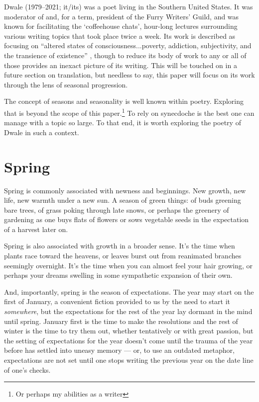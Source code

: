\documentclass[12pt,oneside]{memoir}
\begin{document}
Dwale (1979--2021; it/its) was a poet living in the Southern United States. It was moderator of and, for a term, president of the Furry Writers' Guild, and was known for facilitating the `coffeehouse chats', hour-long lectures surrounding various writing topics that took place twice a week. Its work is described as focusing on ``altered states of consciousness...poverty, addiction, subjectivity, and the transience of existence'' \parencite{dwale}, though to reduce its body of work to any or all of those provides an inexact picture of its writing. This will be touched on in a future section on translation, but needless to say, this paper will focus on its work through the lens of seasonal progression. 

The concept of seasons and seasonality is well known within poetry. Exploring that is beyond the scope of this paper.\footnote{Or perhaps my abilities as a writer} To rely on synecdoche is the best one can manage with a topic so large. To that end, it is worth exploring the poetry of Dwale in such a context.

\section*{Spring}

Spring is commonly associated with newness and beginnings. New growth, new life, new warmth under a new sun. A season of green things: of buds greening bare trees, of grass poking through late snows, or perhaps the greenery of gardening as one buys flats of flowers or sows vegetable seeds in the expectation of a harvest later on.

Spring is also associated with growth in a broader sense. It's the time when plants race toward the heavens, or leaves burst out from reanimated branches seemingly overnight. It's the time when you can almost feel your hair growing, or perhaps your dreams swelling in some sympathetic expansion of their own.

And, importantly, spring is the season of expectations. The year may start on the first of January, a convenient fiction provided to us by the need to start it \emph{somewhere}, but the expectations for the rest of the year lay dormant in the mind until spring. January first is the time to make the resolutions and the rest of winter is the time to try them out, whether tentatively or with great passion, but the setting of expectations for the year doesn't come until the trauma of the year before has settled into uneasy memory --- or, to use an outdated metaphor, expectations are not set until one stops writing the previous year on the date line of one's checks.
\end{document}
